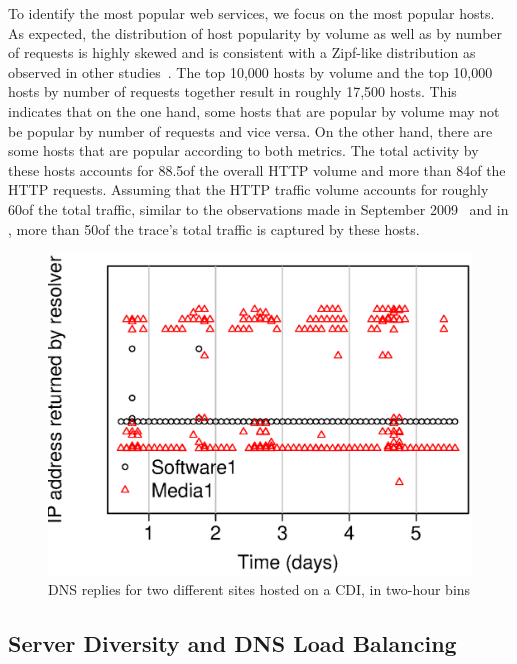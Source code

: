To identify the most popular web services, we focus on the most popular hosts.
As expected, the distribution of host popularity by volume as well as by number
of requests is highly skewed and is consistent with a Zipf-like distribution as
observed in other studies~\cite{OnDominantCharacteristics2009}. The top 10,000
hosts by volume and the top 10,000 hosts by number of requests together result
in roughly 17,500 hosts.  This indicates that on the one hand, some hosts that
are popular by volume may not be popular by number of requests and vice versa.
On the other hand, there are some hosts that are popular according to both
metrics.  The total activity by these hosts accounts for 88.5\perc of the
overall HTTP volume and more than 84\perc of the HTTP requests. Assuming that
the HTTP traffic volume accounts for roughly 60\perc of the total traffic,
similar to the observations made in September 2009~\cite{OnDominantCharacteristics2009,UGCcacheability} 
and in \martrace, more than 50\perc of the trace's total traffic is captured by
these hosts.

\begin{figure}[tbp]
  \centering
  \includegraphics[height=0.7\linewidth]{figures/dns-diversity.eps}
  \caption{DNS replies for two different sites hosted on a CDI, in two-hour bins}%
  \label{fig:dns_diversity}
\end{figure}


\subsection{Server Diversity and DNS Load Balancing}\label{sec:active_dns_measurement} 

